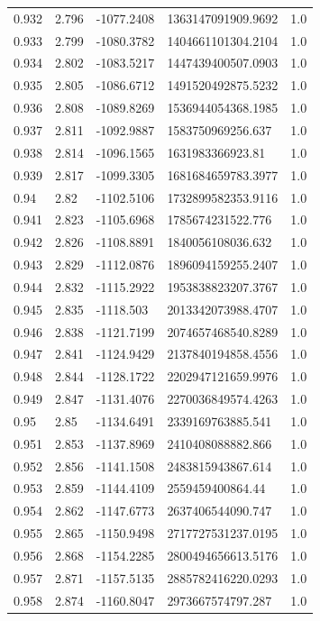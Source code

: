 \begin{tabular}{lllll}
0.932 & 2.796 & -1077.2408 & 1363147091909.9692 & 1.0 \\
0.933 & 2.799 & -1080.3782 & 1404661101304.2104 & 1.0 \\
0.934 & 2.802 & -1083.5217 & 1447439400507.0903 & 1.0 \\
0.935 & 2.805 & -1086.6712 & 1491520492875.5232 & 1.0 \\
0.936 & 2.808 & -1089.8269 & 1536944054368.1985 & 1.0 \\
0.937 & 2.811 & -1092.9887 & 1583750969256.637 & 1.0 \\
0.938 & 2.814 & -1096.1565 & 1631983366923.81 & 1.0 \\
0.939 & 2.817 & -1099.3305 & 1681684659783.3977 & 1.0 \\
0.94 & 2.82 & -1102.5106 & 1732899582353.9116 & 1.0 \\
0.941 & 2.823 & -1105.6968 & 1785674231522.776 & 1.0 \\
0.942 & 2.826 & -1108.8891 & 1840056108036.632 & 1.0 \\
0.943 & 2.829 & -1112.0876 & 1896094159255.2407 & 1.0 \\
0.944 & 2.832 & -1115.2922 & 1953838823207.3767 & 1.0 \\
0.945 & 2.835 & -1118.503 & 2013342073988.4707 & 1.0 \\
0.946 & 2.838 & -1121.7199 & 2074657468540.8289 & 1.0 \\
0.947 & 2.841 & -1124.9429 & 2137840194858.4556 & 1.0 \\
0.948 & 2.844 & -1128.1722 & 2202947121659.9976 & 1.0 \\
0.949 & 2.847 & -1131.4076 & 2270036849574.4263 & 1.0 \\
0.95 & 2.85 & -1134.6491 & 2339169763885.541 & 1.0 \\
0.951 & 2.853 & -1137.8969 & 2410408088882.866 & 1.0 \\
0.952 & 2.856 & -1141.1508 & 2483815943867.614 & 1.0 \\
0.953 & 2.859 & -1144.4109 & 2559459400864.44 & 1.0 \\
0.954 & 2.862 & -1147.6773 & 2637406544090.747 & 1.0 \\
0.955 & 2.865 & -1150.9498 & 2717727531237.0195 & 1.0 \\
0.956 & 2.868 & -1154.2285 & 2800494656613.5176 & 1.0 \\
0.957 & 2.871 & -1157.5135 & 2885782416220.0293 & 1.0 \\
0.958 & 2.874 & -1160.8047 & 2973667574797.287 & 1.0 \\

\end{tabular}
